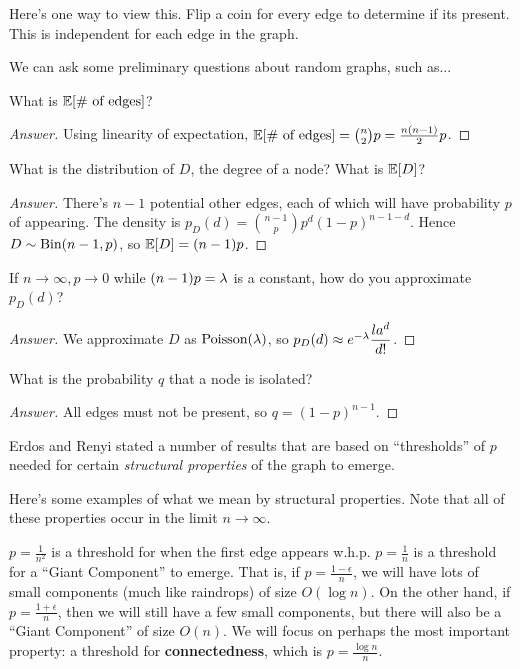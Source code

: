 \documentclass[11 pt]{scrartcl}
\begin{document}
Here's one way to view this. Flip a coin for every edge to determine if its present. This is independent for each edge in the graph. 

We can ask some preliminary questions about random graphs, such as... 

\begin{question}
    What is $\mathbb E[\text{\# of edges}]$?
\end{question}
\begin{proof}[Answer]
    Using linearity of expectation, $\mathbb E[\text{\# of edges}] = \binom{n}{2}p = \frac{n(n-1)}{2}p$. 
\end{proof}

\begin{question}
    What is the distribution  of $D$, the degree of a node? What is $\mathbb E[D]$? 
\end{question}
\begin{proof}[Answer]
    There's $n-1$ potential other edges, each of which will have probability $p$ of appearing. The density is $p_D(d) = \binom{n-1}{p} p^d(1-p)^{n-1-d}$. Hence $D\sim \text{Bin}(n-1, p)$, so $\mathbb E[D] = (n-1)p$.  
\end{proof}

\begin{question}
    If $n\to\infty, p\to 0$ while $(n-1)p = \lambda$ is a constant, how do you approximate $p_D(d)$? 
\end{question}
\begin{proof}[Answer]
    We approximate $D$ as $\text{Poisson}(\lambda)$, so $p_D(d) \approx e^{-\lambda}\dfrac{la^d}{d!}$. 
\end{proof}

\begin{question}
    What is the probability $q$ that a node is isolated? 
\end{question}
\begin{proof}[Answer]
    All edges must not be present, so $q = (1-p)^{n-1}$. 
\end{proof}

Erdos and Renyi stated a number of results that are based on ``thresholds'' of $p$ needed for certain \emph{structural properties} of the graph to emerge. 

\begin{example}
    Here's some examples of what we mean by structural properties. Note that all of these properties occur in the limit $n\to \infty$.
    \begin{itemize}
        \ii $p = \frac{1}{n^2}$ is a threshold for when the first edge appears w.h.p.
        \ii $p = \frac{1}{n}$ is a threshold for a ``Giant Component'' to emerge. That is, if $p = \frac{1-\epsilon}{n}$, we will have lots of small components (much like raindrops) of size $O(\log n)$. On the other hand, if $p = \frac{1+\epsilon}{n}$, then we will still have a few small components, but there will also be a ``Giant Component'' of size $O(n)$. 
        \ii We will focus on perhaps the most important property: a threshold for \textbf{connectedness}, which is $p = \frac{\log n}{n}$.  
    \end{itemize}
\end{example}
\end{document}
